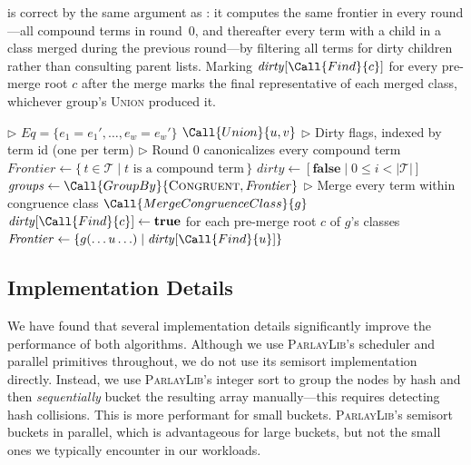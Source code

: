 \filteralgo{} is correct by the same argument as \parentalgo{}: it computes
the same frontier in every round---all compound terms in round~0, and
thereafter every term with a child in a class merged during the previous
round---by filtering all terms for dirty children rather than consulting
parent lists. Marking $\mathit{dirty}[\Call{Find}{c}]$ for every pre-merge
root $c$ after the merge marks the final representative of each merged
class, whichever group's \textsc{Union} produced it.

\begin{algorithm}
\begin{algorithmic}[1]

        \State $\rhd$ $\mathit{Eq} = \{e_1 = e_1', \ldots, e_w = e_w'\}$
          \State $\Call{Union}{u, v}$
        \EndParFor
        \State $\rhd$ Dirty flags, indexed by term id (one per term)
        \State $\rhd$ Round 0 canonicalizes every compound term
        \State $\mathit{Frontier} \gets \{\, t \in \mathcal{T} \mid t \text{ is a compound term} \,\}$
          \State $\mathit{dirty} \gets [\textbf{false} \mid 0 \leq i < |\mathcal{T}|]$
          \State $\mathit{groups} \gets \Call{GroupBy}{\textsc{Congruent}, \mathit{Frontier}}$
            \State $\rhd$ Merge every term within congruence class
            \State $\Call{MergeCongruenceClass}{g}$
            \State $\mathit{dirty}[\Call{Find}{c}] \gets \textbf{true}$ for each pre-merge root $c$ of $g$'s classes
          \EndParFor
          \State $\mathit{Frontier} \gets \{g(\ldots u \ldots) \mid \mathit{dirty}[\Call{Find}{u}]\}$
        \EndWhile
    \EndFunction
\end{algorithmic}
\caption{\filteralgo: filtering-based bulk-synchronous algorithm}
\label{alg:dirty-children}
\end{algorithm}

\subsection{Implementation Details}

We have found that several implementation details significantly improve the
performance of both algorithms. Although we use \textsc{ParlayLib}'s scheduler
and parallel primitives throughout, we do not use its semisort implementation
directly. Instead, we use \textsc{ParlayLib}'s integer sort to group the nodes
by hash and then \emph{sequentially} bucket the resulting array manually---this
requires detecting hash collisions. This is more performant for small buckets.
\textsc{ParlayLib}'s semisort buckets in parallel, which is advantageous for
large buckets, but not the small ones we typically encounter in our workloads.

